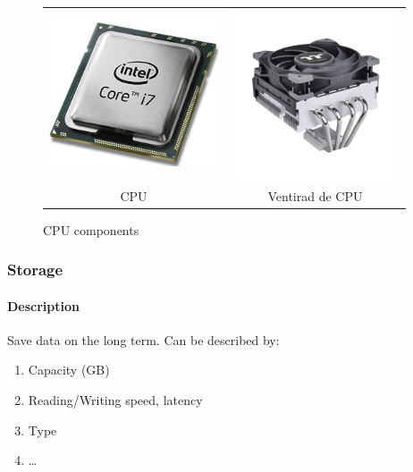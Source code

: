 \documentclass[11pt]{article}
\begin{document}
					\begin{figure}[h!]
							\centering
							\begin{tabular}[!h]{c|c}
								\includegraphics[width=5cm]{figures/CPU.jpg} & \includegraphics[width=5cm]{figures/CPU_cooler.jpg} \\
								CPU                                          & Ventirad de CPU
							\end{tabular}
							\caption{CPU components}
					\end{figure}

			\subsubsection{Storage}

				\paragraph{Description}
					Save data on the long term. Can be described by:
					\begin{enumerate}
							\item Capacity (GB)
							\item Reading/Writing speed, latency
							\item Type
							\item \ldots
					\end{enumerate}
\end{document}
